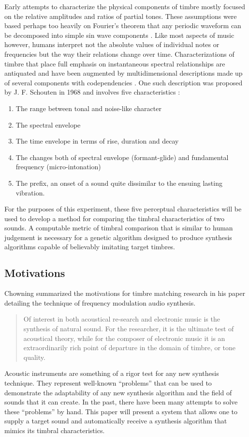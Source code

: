 \documentclass[12pt]{article}
\begin{document}
Early attempts to characterize the physical components of timbre mostly focused on the relative amplitudes and ratios of partial tones. These assumptions were based perhaps too heavily on Fourier's theorem that any periodic waveform can be decomposed into simple sin wave components \citep{helmholtz1857physiological, helmholtz1954sensations}. Like most aspects of music however, humans interpret not the absolute values of individual notes or frequencies but the way their relations change over time. Characterizations of timbre that place full emphasis on instantaneous spectral relationships are antiquated and have been augmented by multidimensional descriptions made up of several components with codependencies \citep{erickson1975sound}. One such description was proposed by J. F. Schouten in 1968 and involves five characteristics \citep{schouten1968perception, erickson1975sound}:
\begin{enumerate}
\item
The range between tonal and noise-like character
\item
The spectral envelope
\item
The time envelope in terms of rise, duration and decay
\item
The changes both of spectral envelope (formant-glide) and fundamental frequency (micro-intonation)
\item
The prefix, an onset of a sound quite dissimilar to the ensuing lasting vibration.
\end{enumerate}

For the purposes of this experiment, these five perceptual characteristics will be used to develop a method for comparing the timbral characteristics of two sounds. A computable metric of timbral comparison that is similar to human judgement is necessary for a genetic algorithm designed to produce synthesis algorithms capable of believably imitating target timbres.

\subsection{Motivations}
Chowning summarized the motivations for timbre matching research in his paper detailing the technique of frequency modulation audio synthesis.
\begin{quote}
Of interest in both acoustical re-search and electronic music is the synthesis of natural sound. For the researcher, it is the ultimate test of acoustical theory, while for the composer of electronic music it is an extraordinarily rich point of departure in the domain of timbre, or tone quality. \citep{chowning1973synthesis}
\end{quote}
Acoustic instruments are something of a rigor test for any new synthesis technique. They represent well-known ``problems'' that can be used to demonstrate the adaptability of any new synthesis algorithm and the field of sounds that it can create. In the past, there have been many attempts to solve these ``problems'' by hand. This paper will present a system that allows one to supply a target sound and automatically receive a synthesis algorithm that mimics its timbral characteristics.
	
\end{document}
